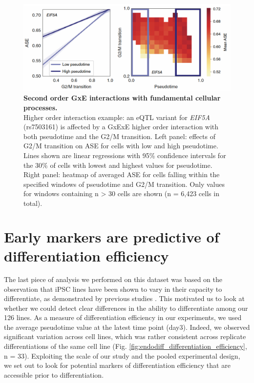 \begin{figure}[h]
\centering
\includegraphics[width=15.5cm]{Chapter4/Fig/endodiff_GxExE.png}
\caption[Second order GxE interactions with fundamental cellular processes]{\textbf{Second order GxE interactions with fundamental cellular processes.}\\
Higher order interaction example: an eQTL variant for \textit{EIF5A} (rs7503161) is affected by a GxExE higher order interaction with both pseudotime and the G2/M transition. 
Left panel: effects of G2/M transition on ASE for cells with low and high pseudotime. 
Lines shown are linear regressions with 95\% confidence intervals for the 30\% of cells with lowest and highest values for pseudotime. 
Right panel: heatmap of averaged ASE for cells falling within the specified windows of pseudotime and G2/M transition. 
Only values for windows containing n > 30 cells are shown (n = 6,423 cells in total).}
\label{fig:endodiff_gxexe}
\end{figure}

\newpage

\section{Early markers are predictive of differentiation efficiency}
\label{sec:endodiff_differentiation_efficiency}

The last piece of analysis we performed on this dataset was based on the observation that iPSC lines have been shown to vary in their capacity to differentiate, as demonstrated by previous studies \cite{bock2011reference}.
This motivated us to look at whether we could detect clear differences in the ability to differentiate among our 126 lines.
As a measure of differentiation efficiency in our experiments, we used the average pseudotime value at the latest time point (day3).
Indeed, we observed significant variation across cell lines, which was rather consistent across replicate differentiations of the same cell line (Fig. \ref{fig:endodiff_differentiation_efficiency}, n = 33).
Exploiting the scale of our study and the pooled experimental design, we set out to look for potential markers of differentiation efficiency that are accessible prior to differentiation.

